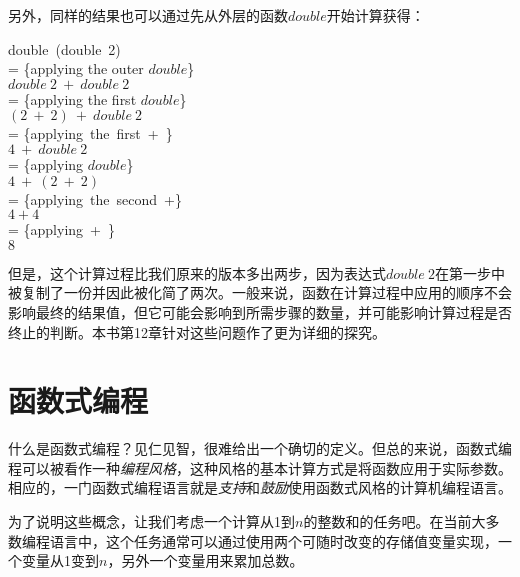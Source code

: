 另外，同样的结果也可以通过先从外层的函数$double$开始计算获得：

\noindent\hspace*{1cm} double~(double~2)\\
\hspace*{1cm} = \{applying the outer $double$\}\\
\hspace*{1cm} $double~2~+~double~2$\\
\hspace*{1cm} = \{applying the first $double$\}\\
\hspace*{1cm} $(2~+~2)~+~double~2$\\
\hspace*{1cm} = \{applying~the~first~+~\}\\
\hspace*{1cm} $4~+~double~2$\\
\hspace*{1cm} = \{applying $double$\}\\
\hspace*{1cm} $4~+~(2~+~2)$\\
\hspace*{1cm} = \{applying~the~second~+\}\\
\hspace*{1cm} $4 + 4$\\
\hspace*{1cm} = \{applying~+~\}\\
\hspace*{1cm} $8$

但是，这个计算过程比我们原来的版本多出两步，因为表达式$double~
2$在第一步中被复制了一份并因此被化简了两次。一般来说，函数在计算过程中应用的顺序不会影响最终的结果值，但它可能会影响到所需步骤的数量，并可能影响计算过程是否终止的判断。本书第12章针对这些问题作了更为详细的探究。

\section{函数式编程}

什么是函数式编程？见仁见智，很难给出一个确切的定义。但总的来说，函数式编程可以被看作一种\textit{编程风格}，这种风格的基本计算方式是将函数应用于实际参数。相应的，一门函数式编程语言就是\textit{支持}和\textit{鼓励}使用函数式风格的计算机编程语言。

为了说明这些概念，让我们考虑一个计算从1到$n$的整数和的任务吧。在当前大多数编程语言中，这个任务通常可以通过使用两个可随时改变的存储值变量实现，一个变量从1变到$n$，另外一个变量用来累加总数。

